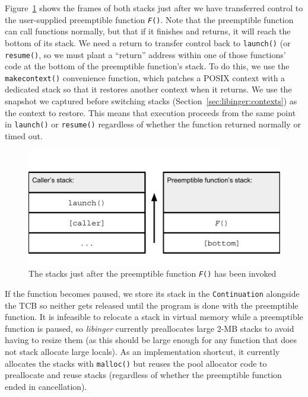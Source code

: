 Figure~\ref{fig:twostacks} shows the frames of both stacks just after we have
transferred control to the user-supplied preemptible function \texttt{\textit{F}()}.
Note that the preemptible function can call functions normally, but that if it
finishes and returns, it will reach the bottom of its stack.  We need a return to
transfer control back to \texttt{launch()} (or \texttt{resume()}, so we must plant a
``return'' address within one of those functions' code at the bottom of the
preemptible function's stack.  To do this, we use the \texttt{makecontext()}
convenience function, which patches a POSIX context with a dedicated stack so that it
restores another context when it returns.  We use the snapshot we captured before
switching stacks (Section~\ref{sec:libinger:contexts}) as the context to restore.
This means that execution proceeds from the same point in \texttt{launch()} or
\texttt{resume()} regardless of whether the function returned normally or timed out.

\begin{figure}
\includegraphics[width=\columnwidth]{figs/twostacks}
\caption{The stacks just after the preemptible function \texttt{\textit{F}()} has been invoked}
\label{fig:twostacks}
\end{figure}

If the function becomes paused, we store its stack in the \texttt{Continuation}
alongside the TCB so neither gets released until the program is done with the
preemptible function.  It is infeasible to relocate a stack in virtual memory while a
preemptible function is paused, so \textit{libinger} currently preallocates large
2-MB stacks to avoid having to resize them (as this should be large enough for any
function that does not stack allocate large locals).  As an implementation shortcut,
it currently allocates the stacks with \texttt{malloc()} but reuses the pool
allocator code to preallocate and reuse stacks (regardless of whether the preemptible
function ended in cancellation).

